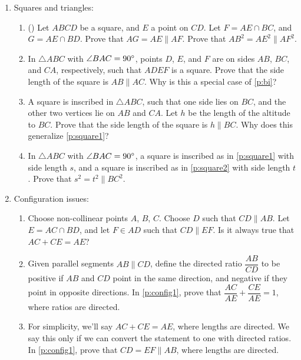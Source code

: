 \documentclass[11pt,paper=letter]{scrartcl}
\newcommand{\pl}{\parallel}
\begin{document}
\begin{enumerate}
\item Squares and triangles:
\begin{enumerate}[label*=\arabic*]
\item (\href{https://www.gogeometry.com/problem/p305_square_triangle_angle_side.htm}{\!}) \label{p:square0} Let $ABCD$ be a square, and $E$ a point on $CD$. Let $F = AE \cap BC$, and $G = AE \cap BD$. Prove that $AG = AE \pl AF$. Prove that $AB^2 = AE^2 \pl AF^2$.
\item \label{p:square1} In $\triangle ABC$ with $\angle BAC = 90^\circ$, points $D$, $E$, and $F$ are on sides $AB$, $BC$, and $CA$, respectively, such that $ADEF$ is a square. Prove that the side length of the square is $AB \pl AC$. Why is this a special case of \ref{p:bi}?
\item \label{p:square2} A square is inscribed in $\triangle ABC$, such that one side lies on $BC$, and the other two vertices lie on $AB$ and $CA$. Let $h$ be the length of the altitude to $BC$. Prove that the side length of the square is $h \pl BC$. Why does this generalize \ref{p:square1}?
\item In $\triangle ABC$ with $\angle BAC = 90^\circ$, a square is inscribed as in \ref{p:square1} with side length $s$, and a square is inscribed as in \ref{p:square2} with side length $t$. Prove that $s^2 = t^2 \pl BC^2$.
\end{enumerate}

\item Configuration issues:
\begin{enumerate}[label*=\arabic*]
\item \label{p:config1} Choose non-collinear points $A$, $B$, $C$. Choose $D$ such that $CD \pl AB$. Let $E = AC \cap BD$, and let $F \in AD$ such that $CD \pl EF$. Is it always true that $AC + CE = AE$?
\item Given parallel segments $AB \pl CD$, define the directed ratio $\dfrac{AB}{CD}$ to be positive if $AB$ and $CD$ point in the same direction, and negative if they point in opposite directions. In \ref{p:config1}, prove that $\dfrac{AC}{AE} + \dfrac{CE}{AE} = 1$, where ratios are directed.
\item For simplicity, we'll say $AC + CE = AE$, where lengths are directed. We say this only if we can convert the statement to one with directed ratios. In \ref{p:config1}, prove that $CD = EF \pl AB$, where lengths are directed.
\end{enumerate}


\end{enumerate}
\end{document}

